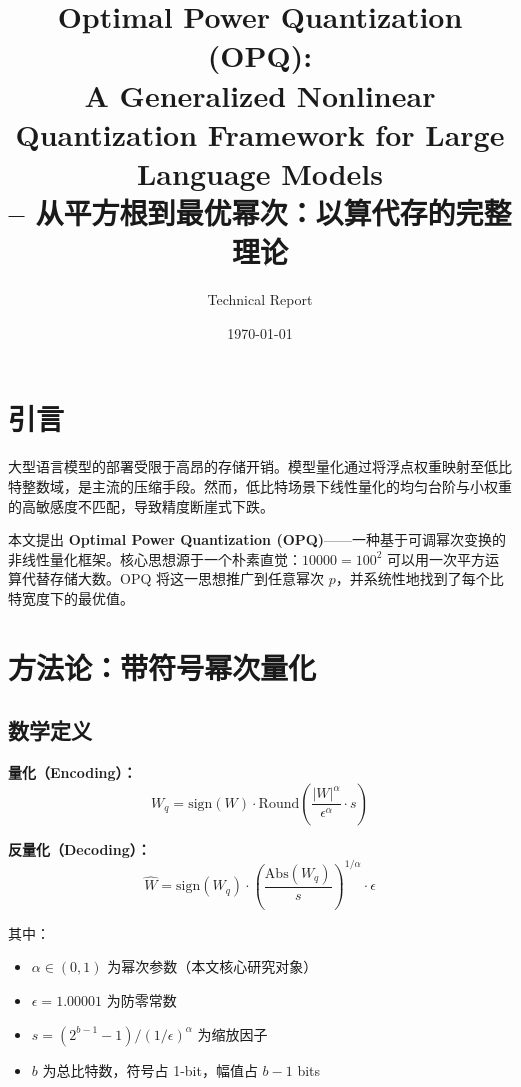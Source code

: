 \documentclass[11pt,a4paper]{article}
\title{Optimal Power Quantization (OPQ):\\
A Generalized Nonlinear Quantization Framework for Large Language Models\\
\large -- 从平方根到最优幂次：以算代存的完整理论}
\author{Technical Report}
\date{\today}
\begin{document}
\maketitle


\tableofcontents
\newpage

\section{引言}

大型语言模型的部署受限于高昂的存储开销。模型量化通过将浮点权重映射至低比特整数域，是主流的压缩手段。然而，低比特场景下线性量化的均匀台阶与小权重的高敏感度不匹配，导致精度断崖式下跌。

本文提出 \textbf{Optimal Power Quantization (OPQ)}——一种基于可调幂次变换的非线性量化框架。核心思想源于一个朴素直觉：$10000 = 100^2$ 可以用一次平方运算代替存储大数。OPQ 将这一思想推广到任意幂次 $p$，并系统性地找到了每个比特宽度下的最优值。

\section{方法论：带符号幂次量化}

\subsection{数学定义}

\textbf{量化（Encoding）：}
$$W_q = \text{sign}(W) \cdot \text{Round}\left( \frac{|W|^\alpha}{\epsilon^\alpha} \cdot s \right)$$

\textbf{反量化（Decoding）：}
$$\hat{W} = \text{sign}(W_q) \cdot \left( \frac{\text{Abs}(W_q)}{s} \right)^{1/\alpha} \cdot \epsilon$$

其中：
\begin{itemize}
\item $\alpha \in (0, 1)$ 为幂次参数（本文核心研究对象）
\item $\epsilon = 1.00001$ 为防零常数
\item $s = (2^{b-1}-1) / (1/\epsilon)^\alpha$ 为缩放因子
\item $b$ 为总比特数，符号占 1-bit，幅值占 $b-1$ bits
\end{itemize}
\end{document}
